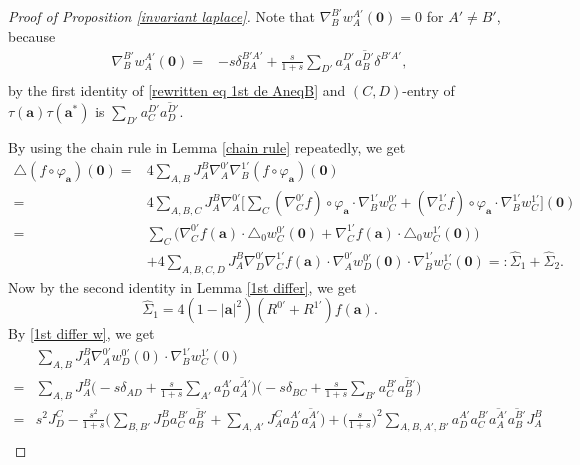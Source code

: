 \documentclass[a4paper,11pt]{amsart}
\numberwithin{equation}{section}
\begin{document}
\begin{proof}[Proof of Proposition \ref{invariant laplace}]
Note that $\nabla_{B}^{B'}w_{A}^{A'}(\mathbf{0})=0$ for $A'\neq B'$, because
\begin{equation}\begin{aligned}\label{1st differ w}
\nabla_{B}^{B'} w_{A}^{A'}(\mathbf{0})=&-s\delta_{BA}^{B'A'}+\frac{s}{1+s}\sum_{D'}a_A^{D'}\overline{a_B^{D'}}\delta^{B'A'},\\
\end{aligned}\end{equation}
by the first identity of \eqref{rewritten eq 1st de AneqB} and $(C,D)$-entry of $\tau(\mathbf{a})\tau(\mathbf{a}^*)$ is $\sum_{D'}a_C^{D'}\overline{a_D^{D'}}$.

By using the chain rule in Lemma \ref{chain rule} repeatedly, we get
\begin{equation}\begin{aligned}\label{**}
\triangle(f\circ\varphi_{\mathbf{a}})(\mathbf{0})=&4\sum_{A,B}J_A^B\nabla_{A}^{0'}\nabla_{B}^{1'}(f\circ \varphi_{\mathbf{a}})(\mathbf{0})\\
=&4\sum_{A,B,C}J_A^B\nabla_{A}^{0'}\bigg[\sum_C(\nabla_{C}^{0'}f)\circ\varphi_{\mathbf{a}}\cdot\nabla_{B}^{1'} w_{C}^{0'}+(\nabla_{C}^{1'} f)\circ\varphi_{\mathbf{a}}\cdot\nabla_{B}^{1'}w_{C}^{1'}\bigg](\mathbf{0})\\
=&\sum_{C}\bigg(\nabla_{C}^{0'}f(\mathbf{a})\cdot\triangle_0 w_{C}^{0'}(\mathbf{0})+\nabla_{C}^{1'}f(\mathbf{a})\cdot\triangle_0 w_{C}^{1'}(\mathbf{0})\bigg)\\
&+4\sum_{A,B,C,D}J_A^B\nabla_{D}^{0'}\nabla_{C}^{1'}f(\mathbf{a})\cdot\nabla_{A}^{0'} w_{D}^{0'}(\mathbf{0})\cdot\nabla_{B}^{1'}w_{C}^{1'}(\mathbf{0})=:\widehat{\Sigma}_1+\widehat{\Sigma}_2.
\end{aligned}\end{equation}
Now by the second identity in Lemma \ref{1st differ}, we get $$\widehat{\Sigma}_1=4(1-|\mathbf{a}|^2)(R^{0'}+R^{1'})f(\mathbf{a}).$$
By \eqref{1st differ w}, we get
\begin{equation*}\begin{aligned}
&\sum_{A,B}J_A^B\nabla_{A}^{0'} w_{D}^{0'}(0)\cdot\nabla_{B}^{1'}w_{C}^{1'}(0)\\
=&\sum_{A,B}J_A^B\bigg(-s\delta_{AD}+\frac{s}{1+s}\sum_{A'}a_D^{A'}\overline{a_A^{A'}}\bigg)
\bigg(-s\delta_{BC}+\frac{s}{1+s}\sum_{B'}a_C^{B'}\overline{a_B^{B'}}\bigg) \\
=&s^2J_D^C-\frac{s^2}{1+s}\bigg(\sum_{B,B'}J_D^Ba_C^{B'}\overline{a_B^{B'}}+\sum_{A,A'}J_A^Ca_D^{A'}\overline{a_A^{A'}}\bigg)+\bigg(\frac{s}{1+s}\bigg)^2\sum_{A,B,A',B'}a_D^{A'}a_C^{B'}\overline{a_A^{A'}}\overline{a_B^{B'}}J_A^B\\

\end{aligned}
\end{equation*}
\end{proof}
\end{document}
